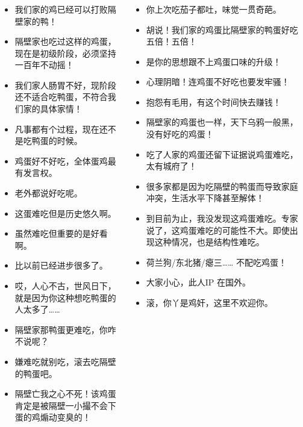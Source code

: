 \documentclass[UTF8,11pt,colorlinks,compress,openany]{beamer}%
\begin{document}
\begin{frame}\frametitle{}
\centering{\large\textcolor{red}{“这鸡蛋真难吃。”}}\footnotesize\vspace{-1ex}
\begin{columns}[onlytextwidth]
\begin{itemize}
	\item 我们家的鸡已经可以打败隔壁家的鸭！
	\item 隔壁家也吃过这样的鸡蛋，现在是初级阶段，必须坚持一百年不动摇！
	\item 我们家人肠胃不好，现阶段还不适合吃鸭蛋，不符合我们家的具体家情！
	\item 凡事都有个过程，现在还不是吃鸭蛋的时候。
	\item 鸡蛋好不好吃，全体蛋鸡最有发言权。
	\item 老外都说好吃呢。
	\item 这蛋难吃但是历史悠久啊。
	\item 虽然难吃但重要的是好看啊。
	\item 比以前已经进步很多了。
	\item 哎，人心不古，世风日下，就是因为你这种想吃鸭蛋的人太多了……
	\item 隔壁家那鸭蛋更难吃，你咋不说呢？
	\item 嫌难吃就别吃，滚去吃隔壁的鸭蛋吧。
	\item 隔壁亡我之心不死！该鸡蛋肯定是被隔壁一小撮不会下蛋的鸡煽动变臭的！
\end{itemize}
\begin{itemize}
	\item 你上次吃茄子都吐，味觉一贯奇葩。
	\item 胡说！我们家的鸡蛋比隔壁家的鸭蛋好吃五倍！五倍！
	\item 是你的思想跟不上鸡蛋口味的升级！
	\item 心理阴暗！连鸡蛋不好吃也要发牢骚！
	\item 抱怨有毛用，有这个时间快去赚钱！
	\item 隔壁家的鸡蛋也一样，天下乌鸦一般黑，没有好吃的鸡蛋！
	\item 吃了人家的鸡蛋还留下证据说鸡蛋难吃，太有城府了！
	\item 很多家都是因为吃隔壁的鸭蛋而导致家庭冲突，生活水平下降甚至解体！
	\item 到目前为止，我没发现这鸡蛋难吃。专家说了，这鸡蛋难吃的可能性不大。即使出现这种情况，也是结构性难吃。
	\item 荷兰狗/东北猪/瘪三…… 不配吃鸡蛋！
	\item 大家小心，此人IP 在国外。
	\item 滚，你丫是鸡奸，这里不欢迎你。
\end{itemize}
\end{columns}
\end{frame}
\end{document}
